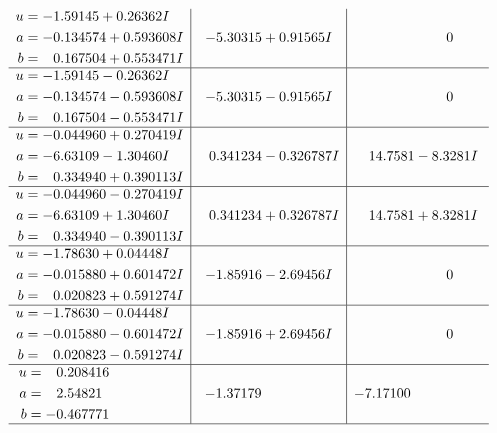 \documentclass[1p]{elsarticle_modified}
\theoremstyle{definition}
\begin{document}
$$\begin{array}{c|c|c}
\begin{aligned}
u &= -1.59145 + 0.26362 I \\
a &= -0.134574 + 0.593608 I \\
b &= \phantom{-}0.167504 + 0.553471 I\end{aligned}
 & -5.30315 + 0.91565 I & \phantom{-0.000000 } 0 \\ \hline\begin{aligned}
u &= -1.59145 - 0.26362 I \\
a &= -0.134574 - 0.593608 I \\
b &= \phantom{-}0.167504 - 0.553471 I\end{aligned}
 & -5.30315 - 0.91565 I & \phantom{-0.000000 } 0 \\ \hline\begin{aligned}
u &= -0.044960 + 0.270419 I \\
a &= -6.63109 - 1.30460 I \\
b &= \phantom{-}0.334940 + 0.390113 I\end{aligned}
 & \phantom{-}0.341234 - 0.326787 I & \phantom{-}14.7581 - 8.3281 I \\ \hline\begin{aligned}
u &= -0.044960 - 0.270419 I \\
a &= -6.63109 + 1.30460 I \\
b &= \phantom{-}0.334940 - 0.390113 I\end{aligned}
 & \phantom{-}0.341234 + 0.326787 I & \phantom{-}14.7581 + 8.3281 I \\ \hline\begin{aligned}
u &= -1.78630 + 0.04448 I \\
a &= -0.015880 + 0.601472 I \\
b &= \phantom{-}0.020823 + 0.591274 I\end{aligned}
 & -1.85916 - 2.69456 I & \phantom{-0.000000 } 0 \\ \hline\begin{aligned}
u &= -1.78630 - 0.04448 I \\
a &= -0.015880 - 0.601472 I \\
b &= \phantom{-}0.020823 - 0.591274 I\end{aligned}
 & -1.85916 + 2.69456 I & \phantom{-0.000000 } 0 \\ \hline\begin{aligned}
u &= \phantom{-}0.208416\phantom{ +0.000000I} \\
a &= \phantom{-}2.54821\phantom{ +0.000000I} \\
b &= -0.467771\phantom{ +0.000000I}\end{aligned}
 & -1.37179\phantom{ +0.000000I} & -7.17100\phantom{ +0.000000I}\\
 \hline 
 \end{array}$$\newpage\newpage\renewcommand{\arraystretch}{1}
\end{document}
